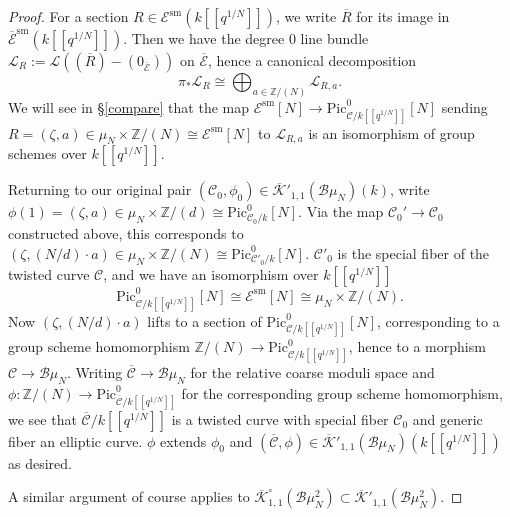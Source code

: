 \documentclass[11pt]{amsart}
\theoremstyle{definition}
\begin{document}
\begin{proof}
For a section $R \in {\mathcal{E}}^{\mathrm{sm}} (k[\![q^{1/N}]\!])$, we write $\overline{R}$ for its image in $\overline{\mathcal{E}}^{\mathrm{sm}} (k[\![q^{1/N}]\!])$. Then we have the degree $0$ line bundle ${\mathcal{L}}_R := {\mathcal{L}}((\overline{R}) - (0_{\overline{\mathcal{E}}}))$ on $\overline{\mathcal{E}}$, hence a canonical decomposition 
\begin{displaymath}
\pi_* {\mathcal{L}}_R \cong \bigoplus_{a \in \mathbb{Z}/(N)} {\mathcal{L}}_{R,a}.
\end{displaymath}
We will see in \S\ref{compare} that the map ${\mathcal{E}}^{\mathrm{sm}}[N] \rightarrow \mathrm{Pic}^0_{{\mathcal{C}}/k[\![q^{1/N}]\!]} [N]$ sending $R = (\zeta, a) \in \mu_N \times \mathbb{Z}/(N) \cong {\mathcal{E}}^{\mathrm{sm}}[N]$ to ${\mathcal{L}}_{R,a}$ is an isomorphism of group schemes over $k[\![q^{1/N}]\!]$.

Returning to our original pair $({\mathcal{C}}_0, \phi_0) \in \overline{\mathcal{K}}'_{1,1}({\mathcal{B}}\mu_N)(k)$, write $\phi(1) = (\zeta, a) \in \mu_N \times \mathbb{Z}/(d) \cong \mathrm{Pic}^0_{{\mathcal{C}}_0/k}[N]$. Via the map ${\mathcal{C}}_0' \rightarrow {\mathcal{C}}_0$ constructed above, this corresponds to $(\zeta, (N/d) \cdot a) \in \mu_N \times \mathbb{Z}/(N) \cong \mathrm{Pic}^0_{{\mathcal{C}}'_0/k}[N]$. ${\mathcal{C}}'_0$ is the special fiber of the twisted curve ${\mathcal{C}}$, and we have an isomorphism over $k[\![q^{1/N}]\!]$ 
\begin{displaymath}
\mathrm{Pic}^0_{{\mathcal{C}}/k[\![q^{1/N}]\!]}[N] \cong {\mathcal{E}}^{\mathrm{sm}}[N] \cong \mu_N \times \mathbb{Z}/(N).
\end{displaymath}
Now $(\zeta, (N/d)\cdot a)$ lifts to a section of $\mathrm{Pic}^0_{{\mathcal{C}}/k[\![q^{1/N}]\!]}[N]$, corresponding to a group scheme homomorphism $\mathbb{Z}/(N) \rightarrow \mathrm{Pic}^0_{{\mathcal{C}}/k[\![q^{1/N}]\!]}$, hence to a morphism ${\mathcal{C}} \rightarrow {\mathcal{B}} \mu_N$. Writing $\overline{\mathcal{C}} \rightarrow {\mathcal{B}}\mu_N$ for the relative coarse moduli space and $\phi: \mathbb{Z}/(N) \rightarrow \mathrm{Pic}^0_{\overline{\mathcal{C}}/k[\![q^{1/N}]\!]}$ for the corresponding group scheme homomorphism, we see that $\overline{\mathcal{C}}/k[\![q^{1/N}]\!]$ is a twisted curve with special fiber ${\mathcal{C}}_0$ and generic fiber an elliptic curve. $\phi$ extends $\phi_0$ and $(\overline{\mathcal{C}}, \phi) \in \overline{\mathcal{K}}'_{1,1}({\mathcal{B}}\mu_N)(k[\![q^{1/N}]\!])$ as desired.

A similar argument of course applies to $\overline{\mathcal{K}}^\circ_{1,1}({\mathcal{B}}\mu_N^2) \subset \overline{\mathcal{K}}'_{1,1}({\mathcal{B}}\mu_N^2)$.
\end{proof}
\end{document}
